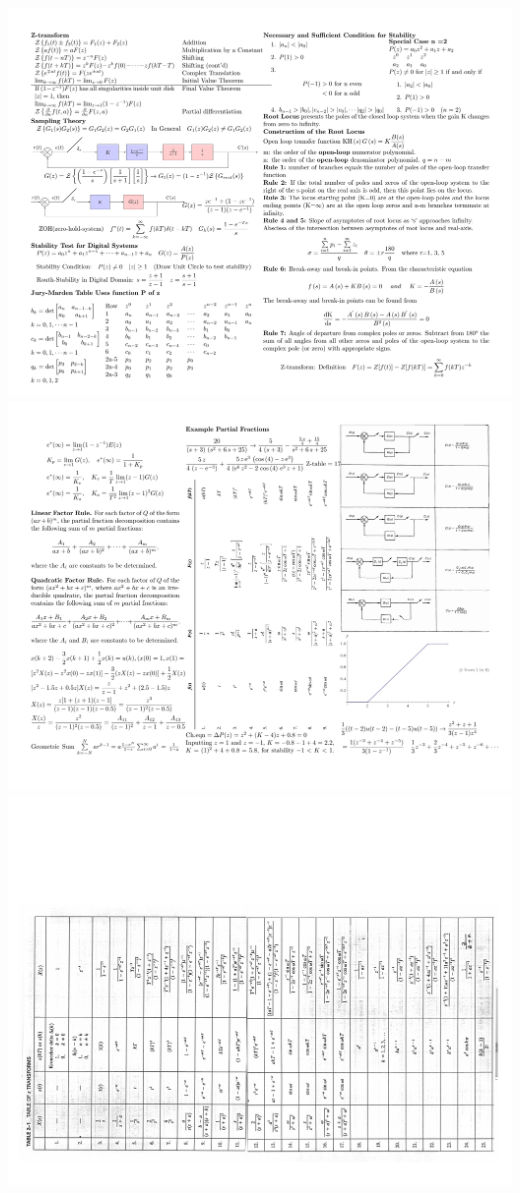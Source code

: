\includegraphics[width=1\linewidth]{elec-460-cheatsheet-1.png}   
\includegraphics[width=1\linewidth]{elec-460-cheatsheet-2.png}   
\includegraphics[width=1\linewidth]{elec-460-cheatsheet-3.png}   